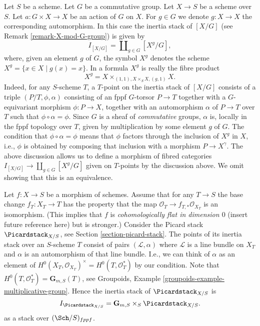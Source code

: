 \begin{example}
\label{example-inertia-stack-of-X-mod-G}
Let $S$ be a scheme. Let $G$ be a commutative group.
Let $X \to S$ be a scheme over $S$.
Let $a : G \times X \to X$ be an action of $G$ on $X$.
For $g \in G$ we denote $g : X \to X$ the corresponding automorphism.
In this case the inertia stack of $[X/G]$ (see
Remark \ref{remark-X-mod-G-group})
is given by
$$
I_{[X/G]} = \coprod\nolimits_{g\in G} [X^g/G],
$$
where, given an element $g$ of $G$, the symbol $X^g$ denotes the
scheme $X^g = \{x \in X \mid g(x) = x\}$. In a formula
$X^g$ is really the fibre
product
$$
X^g =  X \times_{(1, 1), X \times_S X, (g, 1)} X.
$$
Indeed, for any $S$-scheme $T$, a
$T$-point on the inertia stack of $[X/G]$ consists of a
triple $(P/T, \phi, \alpha)$ consisting of an fppf $G$-torsor
$P\to T$ together with a $G$-equivariant morphism
$\phi : P \to X$, together
with an automorphism $\alpha$ of $P\to T$ over $T$ such that
$\phi \circ \alpha = \phi$.
Since $G$ is a sheaf of \emph{commutative} groups,
$\alpha$ is, locally in the fppf topology over $T$,
given by multiplication by some element $g$ of $G$.
The condition that $\phi \circ \alpha = \phi$ means that $\phi$
factors through the inclusion of $X^g$
in $X$, i.e., $\phi$ is obtained by composing that inclusion with a
morphism $P \to X^\gamma$.
The above discussion allows us to define a morphism of fibred categories
$I_{[X/G]} \to \coprod_{g\in G} [X^g/G]$ given on $T$-points by the discussion
above. We omit showing that this is an equivalence.
\end{example}

\begin{example}
\label{example-inertia-stack-of-picard}
Let $f : X \to S$ be a morphism of schemes.
Assume that for any $T \to S$ the base change $f_T : X_T \to T$
has the property that the map $\mathcal{O}_T \to f_{T, *}\mathcal{O}_{X_T}$
is an isomorphism. (This implies that $f$ is
{\it cohomologically flat in dimension $0$} (insert future reference here)
but is stronger.) Consider the Picard stack $\Picardstack_{X/S}$, see
Section \ref{section-picard-stack}.
The points of its inertia stack over an
$S$-scheme $T$ consist of pairs $(\mathcal{L}, \alpha)$
where $\mathcal{L}$ is a line bundle
on $X_T$ and $\alpha$ is an automorphism of that line bundle.
I.e., we can think of $\alpha$ as an element of
$H^0(X_T, \mathcal{O}_{X_T})^\times = H^0(T, \mathcal{O}_T^*)$
by our condition. Note that $H^0(T, \mathcal{O}_T^*) = \mathbf{G}_{m, S}(T)$,
see Groupoids, Example \ref{groupoids-example-multiplicative-group}.
Hence the inertia stack of $\Picardstack_{X/S}$ is
$$
I_{\Picardstack_{X/S}} = \mathbf{G}_{m, S} \times_S \Picardstack_{X/S}.
$$
as a stack over $(\Sch/S)_{fppf}$.
\end{example}






